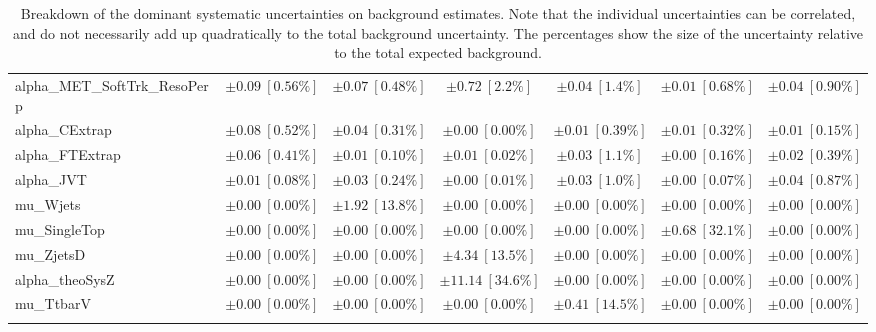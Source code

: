 \begin{sidewaystable}
\begin{center}
\begin{tabular*}{\textwidth}{@{\extracolsep{\fill}}lcccccc}
alpha\_MET\_SoftTrk\_ResoPerp         & $\pm 0.09\ [0.56\%] $          & $\pm 0.07\ [0.48\%] $          & $\pm 0.72\ [2.2\%] $          & $\pm 0.04\ [1.4\%] $          & $\pm 0.01\ [0.68\%] $          & $\pm 0.04\ [0.90\%] $       \\
alpha\_CExtrap         & $\pm 0.08\ [0.52\%] $          & $\pm 0.04\ [0.31\%] $          & $\pm 0.00\ [0.00\%] $          & $\pm 0.01\ [0.39\%] $          & $\pm 0.01\ [0.32\%] $          & $\pm 0.01\ [0.15\%] $       \\
alpha\_FTExtrap         & $\pm 0.06\ [0.41\%] $          & $\pm 0.01\ [0.10\%] $          & $\pm 0.01\ [0.02\%] $          & $\pm 0.03\ [1.1\%] $          & $\pm 0.00\ [0.16\%] $          & $\pm 0.02\ [0.39\%] $       \\
alpha\_JVT         & $\pm 0.01\ [0.08\%] $          & $\pm 0.03\ [0.24\%] $          & $\pm 0.00\ [0.01\%] $          & $\pm 0.03\ [1.0\%] $          & $\pm 0.00\ [0.07\%] $          & $\pm 0.04\ [0.87\%] $       \\
mu\_Wjets         & $\pm 0.00\ [0.00\%] $          & $\pm 1.92\ [13.8\%] $          & $\pm 0.00\ [0.00\%] $          & $\pm 0.00\ [0.00\%] $          & $\pm 0.00\ [0.00\%] $          & $\pm 0.00\ [0.00\%] $       \\
mu\_SingleTop         & $\pm 0.00\ [0.00\%] $          & $\pm 0.00\ [0.00\%] $          & $\pm 0.00\ [0.00\%] $          & $\pm 0.00\ [0.00\%] $          & $\pm 0.68\ [32.1\%] $          & $\pm 0.00\ [0.00\%] $       \\
mu\_ZjetsD         & $\pm 0.00\ [0.00\%] $          & $\pm 0.00\ [0.00\%] $          & $\pm 4.34\ [13.5\%] $          & $\pm 0.00\ [0.00\%] $          & $\pm 0.00\ [0.00\%] $          & $\pm 0.00\ [0.00\%] $       \\
alpha\_theoSysZ         & $\pm 0.00\ [0.00\%] $          & $\pm 0.00\ [0.00\%] $          & $\pm 11.14\ [34.6\%] $          & $\pm 0.00\ [0.00\%] $          & $\pm 0.00\ [0.00\%] $          & $\pm 0.00\ [0.00\%] $       \\
mu\_TtbarV         & $\pm 0.00\ [0.00\%] $          & $\pm 0.00\ [0.00\%] $          & $\pm 0.00\ [0.00\%] $          & $\pm 0.41\ [14.5\%] $          & $\pm 0.00\ [0.00\%] $          & $\pm 0.00\ [0.00\%] $       \\
\noalign{\smallskip}\hline\noalign{\smallskip}
\end{tabular*}
\end{center}
\caption[Breakdown of uncertainty on background estimates]{
Breakdown of the dominant systematic uncertainties on background estimates.
Note that the individual uncertainties can be correlated, and do not necessarily add up quadratically to 
the total background uncertainty. The percentages show the size of the uncertainty relative to the total expected background.
\label{table.results.bkgestimate.uncertainties.VRZD_bybkg}}
\end{sidewaystable}
%